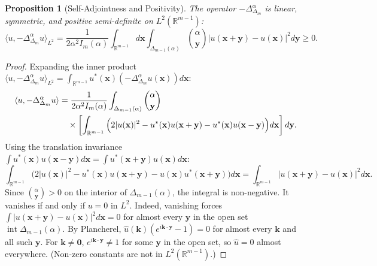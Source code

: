\documentclass[11pt,a4paper]{article}
\theoremstyle{plain}
\newtheorem{proposition}[theorem]{Proposition}
\theoremstyle{definition}
\theoremstyle{remark}
\numberwithin{equation}{section}
\begin{document}
\begin{proposition}[Self-Adjointness and Positivity]
\label{prop:self_adjoint_positive}
The operator $-\Delta_{\Delta_m}^\alpha$ is linear, symmetric, and positive semi-definite on $L^2(\mathbb{R}^{m-1})$:
\begin{equation}
\langle u, -\Delta_{\Delta_m}^\alpha u \rangle_{L^2} = \frac{1}{2\alpha^2 I_m(\alpha)}\int_{\mathbb{R}^{m-1}} d\mathbf{x} \int_{\Delta_{m-1}(\alpha)} \binom{\alpha}{\mathbf{y}} |u(\mathbf{x}+\mathbf{y}) - u(\mathbf{x})|^2 d\mathbf{y} \ge 0.
\end{equation}
\end{proposition}

\begin{proof}
Expanding the inner product $\langle u, -\Delta_{\Delta_m}^\alpha u \rangle_{L^2} = \int_{\mathbb{R}^{m-1}} u^*(\mathbf{x}) (-\Delta_{\Delta_m}^\alpha u(\mathbf{x})) d\mathbf{x}$:
\begin{align*}
\langle u, -\Delta_{\Delta_m}^\alpha u \rangle &= \frac{1}{2\alpha^2 I_m(\alpha)}\int_{\Delta_{m-1}(\alpha)} \binom{\alpha}{\mathbf{y}} \notag \\
&\quad \times \left[ \int_{\mathbb{R}^{m-1}} \Big(2|u(\mathbf{x})|^2 - u^*(\mathbf{x})u(\mathbf{x}+\mathbf{y}) - u^*(\mathbf{x})u(\mathbf{x}-\mathbf{y})\Big) d\mathbf{x} \right] d\mathbf{y}.
\end{align*}
Using the translation invariance $\int u^*(\mathbf{x})u(\mathbf{x}-\mathbf{y})d\mathbf{x} = \int u^*(\mathbf{x}+\mathbf{y})u(\mathbf{x})d\mathbf{x}$:
\begin{equation}
\int_{\mathbb{R}^{m-1}} \Big(2|u(\mathbf{x})|^2 - u^*(\mathbf{x})u(\mathbf{x}+\mathbf{y}) - u(\mathbf{x})u^*(\mathbf{x}+\mathbf{y})\Big) d\mathbf{x} = \int_{\mathbb{R}^{m-1}} |u(\mathbf{x}+\mathbf{y}) - u(\mathbf{x})|^2 d\mathbf{x}.
\end{equation}
Since $\binom{\alpha}{\mathbf{y}} > 0$ on the interior of $\Delta_{m-1}(\alpha)$, the integral is non-negative. It vanishes if and only if $u = 0$ in $L^2$. Indeed, vanishing forces $\int|u(\mathbf{x}+\mathbf{y}) - u(\mathbf{x})|^2d\mathbf{x} = 0$ for almost every $\mathbf{y}$ in the open set $\operatorname{int}\Delta_{m-1}(\alpha)$. By Plancherel, $\widehat{u}(\mathbf{k})(e^{i\mathbf{k}\cdot\mathbf{y}} - 1) = 0$ for almost every $\mathbf{k}$ and all such $\mathbf{y}$. For $\mathbf{k} \ne \mathbf{0}$, $e^{i\mathbf{k}\cdot\mathbf{y}} \ne 1$ for some $\mathbf{y}$ in the open set, so $\widehat{u} = 0$ almost everywhere. (Non-zero constants are not in $L^2(\mathbb{R}^{m-1})$.)
\end{proof}
\end{document}
